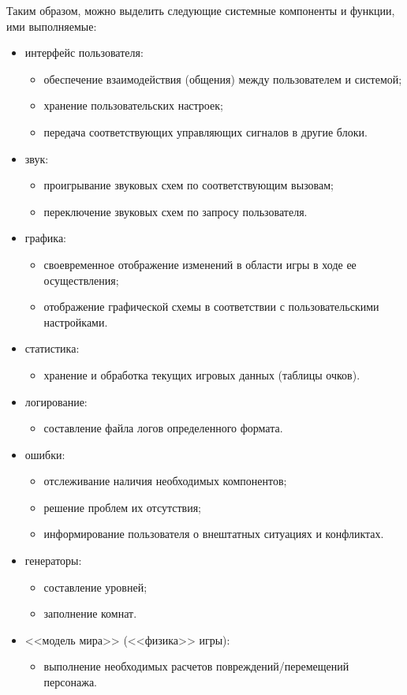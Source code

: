 \documentclass[12pt,a4paper,fullpage,titlepage]{article}
\begin{document}
Таким образом, можно выделить следующие системные компоненты и функции, ими выполняемые:
\begin{itemize}
	\item интерфейс пользователя:
	\begin{itemize}
		\item обеспечение взаимодействия (общения) между пользователем и системой;
		\item хранение пользовательских настроек;
		\item передача соответствующих управляющих сигналов в другие блоки.
	\end{itemize}
	\item звук:
	\begin{itemize}
		\item проигрывание звуковых схем по соответствующим вызовам;
		\item переключение звуковых схем по запросу пользователя.
	\end{itemize}
	\item графика:
	\begin{itemize}
		\item своевременное отображение изменений в области игры в ходе ее осуществления;
		\item отображение графической схемы в соответствии с пользовательскими настройками.
	\end{itemize}
	\item статистика:
	\begin{itemize}
		\item хранение и обработка текущих игровых данных (таблицы очков).
	\end{itemize}
	\item логирование:
	\begin{itemize}
		\item составление файла логов определенного формата.\\
	\end{itemize}	
	\item ошибки:
	\begin{itemize}
		\item отслеживание наличия необходимых компонентов;
		\item решение проблем их отсутствия;
		\item информирование пользователя о внештатных ситуациях и конфликтах.
	\end{itemize}
	\item генераторы:	
	\begin{itemize}
		\item составление уровней;
		\item заполнение комнат.
	\end{itemize}
	\item <<модель мира>> (<<физика>> игры):
	\begin{itemize}
		\item выполнение необходимых расчетов повреждений/перемещений персонажа.
	\end{itemize}
\end{itemize}
\end{document}
